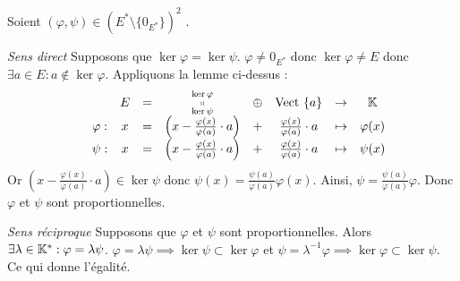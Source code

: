 \documentclass{article}
\begin{document}
\begin{question_kholle}
		\noindent Soient $\left(\varphi,\psi\right) \in \left( E^* \setminus \{0_{E^*}\} \right) ^2$ \fqs.
		
		\textit{Sens direct
		} Supposons que $\ker \varphi = \ker \psi$.
		$\varphi \neq 0_{E^*}$ donc $\ker \varphi \neq E$ donc $\exists a \in E : a \notin \ker \varphi$. Appliquons la lemme ci-dessus :
		\begin{equation*}
			\begin{array}{ccccccccc}
				& & E &=& \substack{\ker \varphi \\ \shortparallel \\ \ker \psi} &\oplus& \text{Vect }{\{a\}} & \rightarrow & \mathbb K \\
				& \varphi : & x &=& \left( x - \frac{\varphi(x)}{\varphi(a)} \cdot a \right) &+& \frac{\varphi(x)}{\varphi(a)} \cdot a & \mapsto & \varphi(x) \\
				& \psi : & x &=& \left( x - \frac{\varphi(x)}{\varphi(a)} \cdot a \right) &+& \frac{\varphi(x)}{\varphi(a)} \cdot a & \mapsto & \psi(x)
			\end{array}
		\end{equation*}
		Or $\left( x - \frac{\varphi(x)}{\varphi(a)} \cdot a \right) \in \ker \psi$ donc $\psi(x) = \frac{\psi(a)}{\varphi(a)} \varphi(x)$.
		Ainsi, $\psi = \frac{\psi(a)}{\varphi(a)} \varphi$. Donc $\varphi$ et $\psi$ sont proportionnelles.
		
		\textit{Sens réciproque} Supposons que $\varphi$ et $\psi$ sont proportionnelles. Alors $\exists \lambda \in \mathbb K^* : \varphi = \lambda \psi$.
		$\varphi = \lambda \psi \implies \ker \psi \subset \ker \varphi$ et
		$\psi = \lambda^{-1} \varphi \implies \ker \varphi \subset \ker \psi$.
		Ce qui donne l'égalité.
	\end{question_kholle}
	
\end{document}
